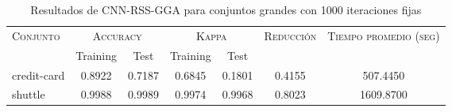 \begin{table}[]
\centering
\begin{tabular}{l c c c c c c}
\hline
\multirow{2}{*}{\textsc{Conjunto}}
	& \multicolumn{2}{c}{\textsc{Accuracy}}
	& \multicolumn{2}{c}{\textsc{Kappa}}
	& \textsc{Reducción}
	& \textsc{Tiempo promedio (seg)} \\
	& Training & Test
	& Training & Test \\ 
\hline
\hline

credit-card & 0.8922 & 0.7187 & 0.6845 & 0.1801 & 0.4155 & 507.4450 \\
shuttle & 0.9988 & 0.9989 & 0.9974 & 0.9968 & 0.8023 & 1609.8700 \\

\hline
\end{tabular}
\caption{Resultados de CNN-RSS-GGA para conjuntos grandes con 1000 iteraciones fijas}
\label{res-grande-cnn-rss-gga}
\end{table}

